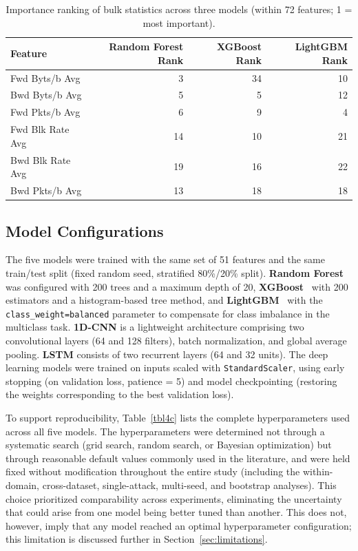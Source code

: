 \documentclass[a4paper,fleqn]{cas-sc}
\begin{document}
\begin{table}[width=.95\linewidth,cols=4,pos=htbp]
\caption{Importance ranking of bulk statistics across three models (within 72 features; 1 = most important).}
\label{tbl4b}
\footnotesize
\begin{tabular*}{\tblwidth}{@{}LRRR@{}}
\toprule
\textbf{Feature} & \textbf{Random Forest Rank} & \textbf{XGBoost Rank} & \textbf{LightGBM Rank} \\
\midrule
Fwd Byts/b Avg & 3 & 34 & 10 \\
Bwd Byts/b Avg & 5 & 5 & 12 \\
Fwd Pkts/b Avg & 6 & 9 & 4 \\
Fwd Blk Rate Avg & 14 & 10 & 21 \\
Bwd Blk Rate Avg & 19 & 16 & 22 \\
Bwd Pkts/b Avg & 13 & 18 & 18 \\
\bottomrule
\end{tabular*}
\end{table}

\FloatBarrier
\subsection{Model Configurations}

The five models were trained with the same set of 51 features and the same train/test split (fixed random seed, stratified 80\%/20\% split). \textbf{Random Forest}~\cite{Breiman2001} was configured with 200 trees and a maximum depth of 20, \textbf{XGBoost}~\cite{ChenGuestrin2016} with 200 estimators and a histogram-based tree method, and \textbf{LightGBM}~\cite{Ke2017} with the \texttt{class\_weight=balanced} parameter to compensate for class imbalance in the multiclass task. \textbf{1D-CNN} is a lightweight architecture comprising two convolutional layers (64 and 128 filters), batch normalization, and global average pooling. \textbf{LSTM} consists of two recurrent layers (64 and 32 units). The deep learning models were trained on inputs scaled with \texttt{StandardScaler}, using early stopping (on validation loss, patience = 5) and model checkpointing (restoring the weights corresponding to the best validation loss).

To support reproducibility, Table~\ref{tbl4c} lists the complete hyperparameters used across all five models. The hyperparameters were determined not through a systematic search (grid search, random search, or Bayesian optimization) but through reasonable default values commonly used in the literature, and were held fixed without modification throughout the entire study (including the within-domain, cross-dataset, single-attack, multi-seed, and bootstrap analyses). This choice prioritized comparability across experiments, eliminating the uncertainty that could arise from one model being better tuned than another. This does not, however, imply that any model reached an optimal hyperparameter configuration; this limitation is discussed further in Section~\ref{sec:limitations}.
\end{document}
